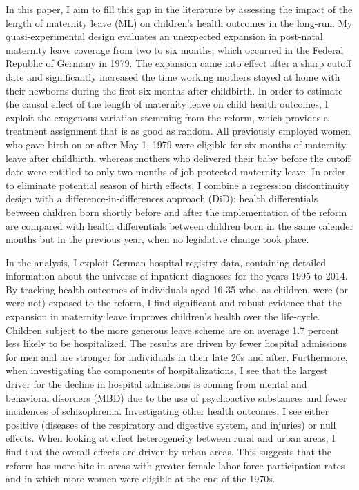 \documentclass[11pt, a4paper]{article} %
\begin{document}
In this paper, I aim to fill this gap in the literature by assessing the impact of the length of maternity leave (ML) on children’s health outcomes in the long-run. My quasi-experimental design evaluates an unexpected expansion in post-natal maternity leave coverage from two to six months, which occurred in the Federal Republic of Germany in 1979. The expansion came into effect after a sharp cutoff date and significantly increased the time working mothers stayed at home with their newborns during the first six months after childbirth. In order to estimate the causal effect of the length of maternity leave on child health outcomes, I exploit the exogenous variation stemming from the reform, which provides a treatment assignment that is as good as random. All previously employed women who gave birth on or after May 1, 1979 were eligible for six months of maternity leave after childbirth, whereas mothers who delivered their baby before the cutoff date were entitled to only two months of job-protected maternity leave. In order to eliminate potential season of birth effects, I combine a regression discontinuity design with a difference-in-differences approach (DiD): health differentials between children born shortly before and after the implementation of the reform are compared with health differentials between children born in the same calender months but in the previous year, when no legislative change took place.\newline


In the analysis, I exploit German hospital registry data, containing detailed information about the universe of inpatient diagnoses for the years 1995 to 2014. By tracking health outcomes of individuals aged 16-35 who, as children, were (or were not) exposed to the reform, I find significant and robust evidence that the expansion in maternity leave improves children's health over the life-cycle. Children subject to the more generous leave scheme are on average 1.7 percent less likely to be hospitalized. The results are driven by fewer hospital admissions for men and are stronger for individuals in their late 20s and after. Furthermore, when investigating the components of hospitalizations, I see that the largest driver for the decline in hospital admissions is coming from mental and behavioral disorders (MBD) due to the use of psychoactive substances and fewer incidences of schizophrenia. Investigating other health outcomes, I see either positive (diseases of the respiratory and digestive system, and injuries) or null effects. When looking at effect heterogeneity between rural and urban areas, I find that the overall effects are driven by urban areas. This suggests that the reform has more bite in areas with greater female labor force participation rates and in which more women were eligible at the end of the 1970s. \newline
\end{document}
